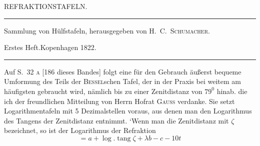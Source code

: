 \clearpage{}%
\begin{center}
{\small REFRAKTIONSTAFELN.\par}
\medskip\hrule\medskip
{\small Sammlung von Hülfstafeln, herausgegeben von H.\ C.\ \textsc{Schumacher}.\par
Erstes Heft.\quad Kopenhagen 1822.\par}
\medskip\hrule
\end{center}\medskip
Auf S.\ 32 \textsc{a} [186 dieses Bandes] folgt eine für den Gebrauch äußerst bequeme Umformung des Teils der \textsc{Bessel}schen Tafel, der in der Praxis bei weitem am häufigsten gebraucht wird, nämlich bis zu einer Zenitdistanz von $79^0$ hinab. die ich der freundlichen Mitteilung von Herrn Hofrat \textsc{Gauss} verdanke. Sie setzt Logarithmentafeln mit 5 Dezimalstellen voraus, aus denen man den Logarithmus des Tangens der Zenitdistanz entnimmt. `Wenn man die Zenitdistanz mit $\zeta$ bezeichnet, so ist der Logarithmus der Refraktion
\[
=a+\log.\operatorname{tang}\zeta+\lambda b-c-10t
\]

